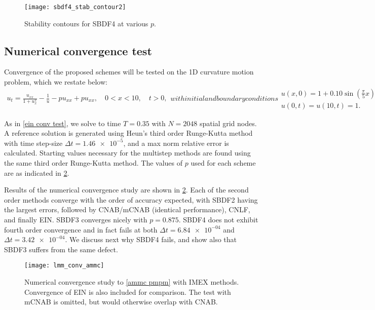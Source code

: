 \begin{figure}[htb!]
        \centering
\texttt{[image: sbdf4\_stab\_contour2]}
\caption[Stability contours for SBDF4 at various $p$]{Stability contours for SBDF4 at various $p$.}
\label{sbdf4 contours}
\end{figure}

\subsection{Numerical convergence test}
Convergence of the proposed schemes will be tested on the 1D curvature motion problem, which we restate below:
\begin{subequations}
\begin{align}
        u_t = \frac{u_{xx}}{1 + u_x^2} - \frac{1}{u} - pu_{xx} + pu_{xx},
\quad 0< x< 10,\quad t>0,
\end{align}
with initial and boundary conditions
\begin{gather}
        u(x,0) = 1 + 0.10\sin\left(\frac{\pi}{5}x \right) 
\\
u(0,t) = u(10,t) = 1.
\end{gather}
\label{ammc pmpm}
\end{subequations}

As in \cref{ein conv test}, we solve to time $T=0.35$ with $N=2048$ spatial grid nodes. A reference solution is generated using Heun's third order Runge-Kutta method \cite{hundsdorfer2013numerical} with time step-size $\Delta t = \num{1.46e-5}$, and a max norm relative error is calculated. Starting values necessary for the multistep methods are found using the same third order Runge-Kutta method. The values of $p$ used for each scheme are as indicated in \cref{lmm conv test}.

Results of the numerical convergence study are shown in \cref{lmm conv test}. Each of the second order methods converge with the order of accuracy expected, with SBDF2 having the largest errors, followed by CNAB/mCNAB (identical performance), CNLF, and finally EIN. SBDF3 converges nicely with $p=0.875$. SBDF4 does not exhibit fourth order convergence and in fact fails at both $\Delta t =\num{6.84e-04}$ and $\Delta t=\num{3.42e-04}$. We discuss next why SBDF4 fails, and show also that SBDF3 suffers from the same defect.

\begin{figure}
        \centering
\texttt{[image: lmm\_conv\_ammc]}
\caption[Numerical convergence study with IMEX methods]{Numerical convergence study to \cref{ammc pmpm} with IMEX methods. Convergence of EIN is also included for comparison. The test with mCNAB is omitted, but would otherwise overlap with CNAB.}
\label{lmm conv test}
\end{figure}

